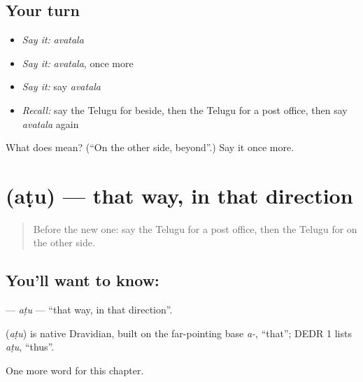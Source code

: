 \subsection*{Your turn}
\begin{itemize}
\raggedright
  \item \emph{Say it:} \emph{avatala}
  \item \emph{Say it:} \emph{avatala}, once more
  \item \emph{Say it:} say \emph{avatala}
  \item \emph{Recall:} say the Telugu for beside, then the Telugu for a post office, then say \emph{avatala} again
\end{itemize}

\begin{tcolorbox}[breakable,colback=teal!4,colframe=teal!35!black,title={Before you move on}]
What does  mean? (\textquotedblleft{}On the other side, beyond\textquotedblright{}.) Say it once more.
\end{tcolorbox}
\section[\texorpdfstring{\te{అటు} (aṭu)}{అటు (aṭu)}]{ (aṭu) — that way, in that direction}

\label{lesson:TE-C174-atu}



\begin{quote}
Before the new one: say the Telugu for a post office, then the Telugu for on the other side.
\end{quote}

\subsection*{You'll want to know: }
\textbf{} — \emph{aṭu} — \textquotedblleft{}that way, in that direction\textquotedblright{}.

\begin{cousinweb}
\textbf{} (\emph{aṭu}) is native Dravidian, built on the far-pointing base \emph{a-}, \textquotedblleft{}that\textquotedblright{}; DEDR 1 lists \emph{aṭu}, \textquotedblleft{}thus\textquotedblright{}.
\end{cousinweb}

\begin{grammarlens}[title={What you've built}]
One more word for this chapter.
\end{grammarlens}


